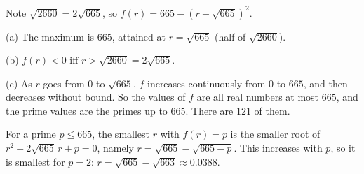 Note $\sqrt{2660}=2\sqrt{665}$, so $f(r)=665-\left(r-\sqrt{665}\right)^2$.

(a) The maximum is $\boxed{665}$, attained at $r=\sqrt{665}$ (half of $\sqrt{2660}$).

(b) $f(r)<0$ iff $r>\boxed{\sqrt{2660}=2\sqrt{665}}$.

(c) As $r$ goes from $0$ to $\sqrt{665}$, $f$ increases continuously from $0$ to $665$, and then decreases without bound. So the values of $f$ are all real numbers at most $665$, and the prime values are the primes up to $665$. There are $\boxed{121}$ of them.

For a prime $p\le665$, the smallest $r$ with $f(r)=p$ is the smaller root of $r^2-2\sqrt{665}\,r+p=0$, namely $r=\sqrt{665}-\sqrt{665-p}$. This increases with $p$, so it is smallest for $p=2$: $r=\boxed{\sqrt{665}-\sqrt{663}}\approx0.0388$.
